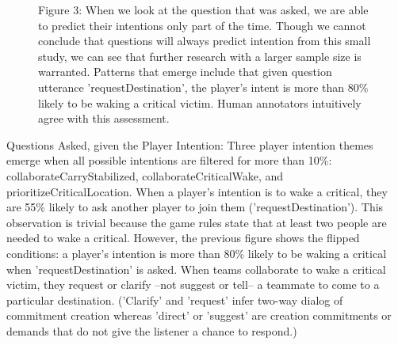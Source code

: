 \begin{figure}[h!]
    \centering
    \caption{Figure 3: When we look at the question that was asked, we are able to predict their intentions only part of the time. Though we cannot conclude that questions will always predict intention from this small study, we can see that further research with a larger sample size is warranted. Patterns that emerge include that given question utterance 'requestDestination', the player's intent is more than 80\% likely to be waking a critical victim. Human annotators intuitively agree with this assessment.}
\end{figure}








Questions Asked, given the Player Intention: Three player intention themes emerge when all possible intentions are filtered for more than 10\%: collaborateCarryStabilized, collaborateCriticalWake, and prioritizeCriticalLocation. When a player's intention is to wake a critical, they are 55\% likely to ask another player to join
 them ('requestDestination'). This observation is trivial because the game rules state that at least two people are needed to wake a critical. However, the previous figure shows the flipped conditions: a player's intention is more than 80\% likely to be waking a critical when 'requestDestination' is asked. When teams collaborate to wake a critical victim, they request or clarify --not suggest or tell-- a teammate to come to a particular destination. ('Clarify' and 'request' infer two-way dialog of commitment creation whereas 'direct' or 'suggest' are creation commitments or demands that do not give the listener a chance to respond.) 





